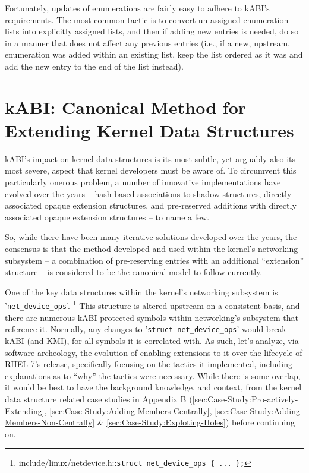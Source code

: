 \documentclass[10pt,oneside,english]{book}
\begin{document}
Fortunately, updates of enumerations are fairly easy to adhere to
kABI's requirements. The most common tactic is to convert un-assigned
enumeration lists into explicitly assigned lists, and then if adding
new entries is needed, do so in a manner that does not affect any
previous entries (i.e., if a new, upstream, enumeration was added
within an existing list, keep the list ordered as it was and add the
new entry to the end of the list instead).

\chapter{kABI: Canonical Method for Extending Kernel Data Structures }

kABI's impact on kernel data structures is its most subtle, yet arguably
also its most severe, aspect that kernel developers must be aware
of. To circumvent this particularly onerous problem, a number of innovative
implementations have evolved over the years -- hash based associations
to shadow structures, directly associated opaque extension structures,
and pre-reserved additions with directly associated opaque extension
structures -- to name a few.

So, while there have been many iterative solutions developed over
the years, the consensus is that the method developed and used within
the kernel's networking subsystem -- a combination of pre-reserving
entries with an additional ``extension'' structure -- is considered
to be the canonical model to follow currently.

One of the key data structures within the kernel's networking subsystem
is '\texttt{net\_device\_ops}'. \footnote{include/linux/netdevice.h::\texttt{struct net\_device\_ops \{ ... \};}}
This structure is altered upstream on a consistent basis, and there
are numerous kABI-protected symbols within networking's subsystem
that reference it. Normally, any changes to '\texttt{struct net\_device\_ops}'
would break kABI (and KMI), for all symbols it is correlated with.
As such, let's analyze, via software archeology, the evolution of
enabling extensions to it over the lifecycle of RHEL 7's release,
specifically focusing on the tactics it implemented, including explanations
as to ``why'' the tactics were necessary. While there is some overlap,
it would be best to have the background knowledge, and context, from
the kernel data structure related case studies in Appendix B (\ref{sec:Case-Study:Pro-actively-Extending},
\ref{sec:Case-Study:Adding-Members-Centrally}, \ref{sec:Case-Study:Adding-Members-Non-Centrally}
\& \ref{sec:Case-Study:Exploting-Holes}) before continuing on.
\end{document}
